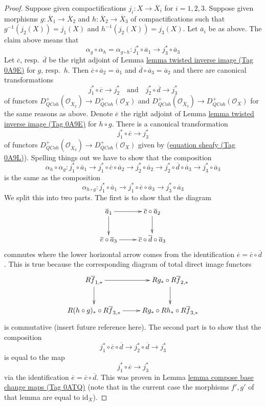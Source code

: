 \documentclass{amsart}
\theoremstyle{plain}
\theoremstyle{definition}
\theoremstyle{remark}
\numberwithin{equation}{subsection}
\def\QCoh{\mathit{QCoh}}
\begin{document}
\begin{proof}
\medskip\noindent
Suppose given compactifications $j_i : X \to \overline{X}_i$
for $i = 1, 2, 3$.  Suppose given morphisms
$g : \overline{X}_1 \to \overline{X}_2$ and
$h : \overline{X}_2 \to \overline{X}_3$ of compactifications
such that $g^{-1}(j_2(X)) = j_1(X)$ and $h^{-1}(j_2(X)) = j_3(X)$.
Let $\overline{a}_i$ be as above. The claim above means that
$$
\alpha_g \circ \alpha_h = \alpha_{g \circ h} :
j_1^* \circ \overline{a}_1 \to j_3^* \circ \overline{a}_3
$$
Let $\overline{c}$, resp.\ $\overline{d}$ be the right adjoint of
Lemma \href{https://stacks.math.columbia.edu/tag/0A9E}{lemma twisted inverse image (Tag 0A9E)} for $g$, resp.\ $h$.
Then $\overline{c} \circ \overline{a}_2 = \overline{a}_1$ and
$\overline{d} \circ \overline{a}_3 = \overline{a}_2$
and there are canonical transformations
$$
j_1^* \circ \overline{c} \longrightarrow j_2^*
\quad\text{and}\quad
j_2^* \circ \overline{d} \longrightarrow j_3^*
$$
of functors
$D^+_\QCoh(\mathcal{O}_{\overline{X}_2}) \to D^+_\QCoh(\mathcal{O}_X)$
and
$D^+_\QCoh(\mathcal{O}_{\overline{X}_3}) \to D^+_\QCoh(\mathcal{O}_X)$
for the same reasons as above. Denote $\overline{e}$ the
right adjoint of Lemma \href{https://stacks.math.columbia.edu/tag/0A9E}{lemma twisted inverse image (Tag 0A9E)}
for $h \circ g$. There is a canonical transformation
$$
j_1^* \circ \overline{e} \longrightarrow j_3^*
$$
of functors
$D^+_\QCoh(\mathcal{O}_{\overline{X}_3}) \to D^+_\QCoh(\mathcal{O}_X)$
given by (\href{https://stacks.math.columbia.edu/tag/0A9L}{equation sheafy (Tag 0A9L)}). Spelling things out we have to
show that the composition
$$
\alpha_h \circ \alpha_g :
j_1^* \circ \overline{a}_1 \to
j_1^* \circ \overline{c} \circ \overline{a}_2 \to
j_2^* \circ \overline{a}_2 \to
j_2^* \circ \overline{d} \circ \overline{a}_3 \to
j_3^* \circ \overline{a}_3
$$
is the same as the composition
$$
\alpha_{h \circ g} :
j_1^* \circ \overline{a}_1 \to
j_1^* \circ \overline{e} \circ \overline{a}_3 \to
j_3^* \circ \overline{a}_3
$$
We split this into two parts. The first is to show that the diagram
$$
\xymatrix{
\overline{a}_1 \ar[r] \ar[d] & \overline{c} \circ \overline{a}_2 \ar[d] \\
\overline{e} \circ \overline{a}_3 \ar[r] &
\overline{c} \circ \overline{d} \circ \overline{a}_3
}
$$
commutes where the lower horizontal arrow comes from the identification
$\overline{e} = \overline{c} \circ \overline{d}$. This is true
because the corresponding diagram of total direct image functors
$$
\xymatrix{
R\overline{f}_{1, *} \ar[r] \ar[d] & Rg_* \circ R\overline{f}_{2, *} \ar[d] \\
R(h \circ g)_* \circ R\overline{f}_{3, *} \ar[r] &
Rg_* \circ Rh_* \circ R\overline{f}_{3, *}
}
$$
is commutative (insert future reference here). The second part
is to show that the composition
$$
j_1^* \circ \overline{c} \circ \overline{d} \to
j_2^* \circ \overline{d} \to j_3^*
$$
is equal to the map
$$
j_1^* \circ \overline{e} \to j_3^*
$$
via the identification $\overline{e} = \overline{c} \circ \overline{d}$.
This was proven in Lemma \href{https://stacks.math.columbia.edu/tag/0ATQ}{lemma compose base change maps (Tag 0ATQ)}
(note that in the current case the morphisms $f', g'$ of that
lemma are equal to $\text{id}_X$).
\end{proof}
\end{document}
